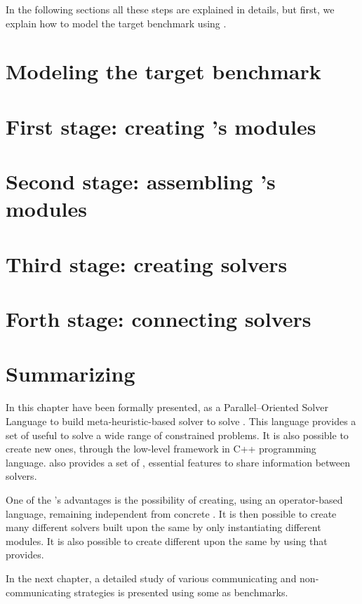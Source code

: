 In the following sections all these steps are explained in details, but first, we explain how to model the target benchmark using \posl.

\section{Modeling the target benchmark}\label{sec:model}


\section{First stage: creating \posl's modules}\label{sec:1ststage}


\section{Second stage: assembling \posl's modules}\label{sec:2ndstage}


\section{Third stage: creating \posl{} solvers}\label{sec:3rdstage}


\section{Forth stage: connecting solvers}\label{sec:4thstage}


\section{Summarizing}\label{sec:posl_zum} \vspace{-10pt}

In this chapter \posl{} have been formally presented, as a Parallel--Oriented Solver Language to build meta-heuristic-based solver to solve \CSPs{}. This language provides a set of \oms{} useful to solve a wide range of constrained problems. It is also possible to create new ones, through the low-level framework in C++ programming language. \posl{} also provides a set of \opchs{}, essential features to share information between solvers.

One of the \posl's advantages is the possibility of creating, using an operator-based language, \ass{} remaining independent from concrete \bothmodules{}. It is then possible to create many different solvers built upon the same \as{} by only instantiating different modules. It is also possible to create different \comstrs{} upon the same \soset{} by using \commopers{} that \posl{} provides.

In the next chapter, a detailed study of various communicating and non-communicating strategies is presented using some \CSPs{} as benchmarks. %